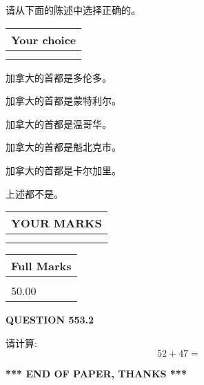 \documentclass{ctexart}
\begin{document}
  
请从下面的陈述中选择正确的。
  
  
\noindent\hspace{3.0in} \begin{tabular}{|l|}
\hline
Your choice \\
\hline
 \\ 
 \\ 
\hline
\end{tabular}
  
  
 
 
加拿大的首都是多伦多。
 
 
加拿大的首都是蒙特利尔。
 
 
加拿大的首都是温哥华。
 
 
加拿大的首都是魁北克市。
 
 
加拿大的首都是卡尔加里。
 
 
 上述都不是。
 
 
  
\vspace{0.2in}
  
\noindent\begin{tabular}{|l|}
\hline
 YOUR MARKS  \\
\hline
 \\ 
 \\ 
\hline
\end{tabular}
\hspace{0.05in} \begin{tabular}{|l|}
\hline
 Full Marks  \\
\hline
 \\ 
50.00 \\
\hline
\end{tabular}
{\textbf{\Large{QUESTION
553.2 
}}}
  
  
 
请计算:
\begin{equation}
52 +  %
47 = \nonumber
\end{equation}
 

 

 
   
   
 \vspace{0.2in}
 
   
   
   
   
\vspace{1.0in} 
{\textbf{\large{ *** END OF PAPER, THANKS *** }}} 
   
\end{document}
